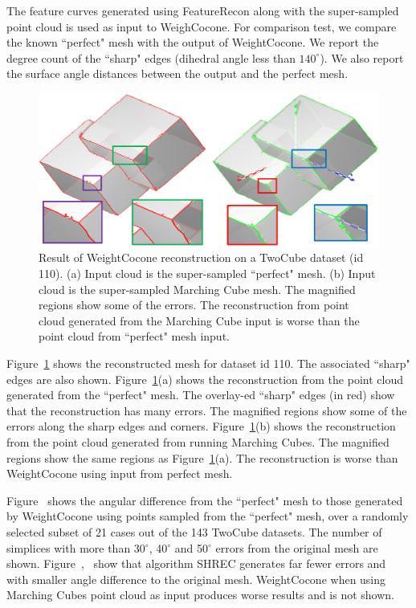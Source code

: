 The feature curves generated using FeatureRecon along with the super-sampled point cloud is used as input to WeighCocone. For comparison test, we compare the known ``perfect" mesh with the output of WeightCocone. 
We report the degree count of the ``sharp" edges (dihedral angle less than $140^\circ$). We also report the surface angle distances between the output and the perfect mesh. 
\begin{figure}[t] 
	\centering  	
	\includegraphics[width=\linewidth]{images/compare_cocone_perfect_mc.eps}
	\caption{Result of WeightCocone reconstruction on a TwoCube dataset (id 110). (a) Input cloud is the super-sampled ``perfect" mesh. (b) Input cloud is the super-sampled Marching Cube mesh. The magnified regions show some of the errors. The reconstruction from point cloud generated from the Marching Cube input is worse than the  point cloud from ``perfect" mesh input. }
	\label{fig:cocone_compare_from_perfect_1}
	\vskip-0.2cm
\end{figure} 
Figure~\ref{fig:cocone_compare_from_perfect_1} shows the reconstructed mesh for dataset id 110. The associated ``sharp" edges are also shown. Figure~\ref{fig:cocone_compare_from_perfect_1}(a) shows the reconstruction from the point cloud generated from the ``perfect" mesh. The overlay-ed ``sharp" edges (in red) show that the reconstruction has many errors. The magnified regions show some of the errors along the sharp edges and corners. Figure~\ref{fig:cocone_compare_from_perfect_1}(b) shows the reconstruction from the point cloud generated from running Marching Cubes. The magnified regions show the same regions as Figure~\ref{fig:cocone_compare_from_perfect_1}(a). The reconstruction is worse than WeightCocone using input from perfect mesh. 

Figure~\protect{} shows the angular difference from the ``perfect" mesh to those generated by WeightCocone using points sampled from the ``perfect" mesh,  over a randomly selected subset of 21 cases out of the 143 TwoCube datasets. The number of simplices with more than 30$^\circ$, 40$^\circ$ and 50$^\circ$ errors from the original mesh are shown. Figure~\protect{},~\protect{} show that algorithm SHREC generates far fewer errors and with smaller angle difference to the original mesh. WeightCocone when using Marching Cubes point cloud as input produces worse results and is not shown.

